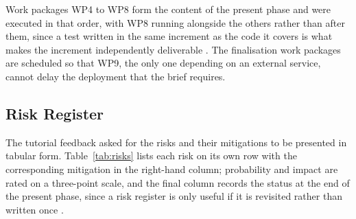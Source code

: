 \documentclass[a4paper,11pt]{article}
\begin{document}
Work packages WP4 to WP8 form the content of the present phase and were executed
in that order, with WP8 running alongside the others rather than after them,
since a test written in the same increment as the code it covers is what makes
the increment independently deliverable \citep{Khorikov2020}. The finalisation
work packages are scheduled so that WP9, the only one depending on an external
service, cannot delay the deployment that the brief requires.

\subsection{Risk Register}\label{subsec:risks}

The tutorial feedback asked for the risks and their mitigations to be presented
in tabular form. Table~\ref{tab:risks} lists each risk on its own row with the
corresponding mitigation in the right-hand column; probability and impact are
rated on a three-point scale, and the final column records the status at the end
of the present phase, since a risk register is only useful if it is revisited
rather than written once \citep{Sommerville2020}.
\end{document}
